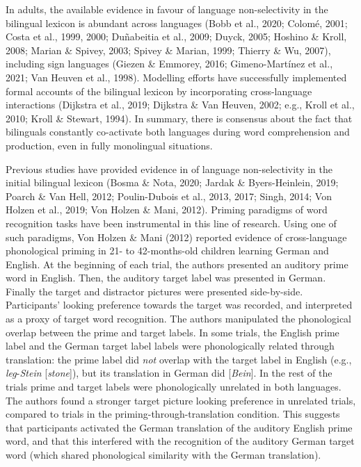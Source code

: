\documentclass[
  12pt,
  b5paperpaper,
  twoside]{scrreprt}
\begin{document}
In adults, the available evidence in favour of language non-selectivity
in the bilingual lexicon is abundant across languages (Bobb et al.,
2020; Colomé, 2001; Costa et al., 1999, 2000; Duñabeitia et al., 2009;
Duyck, 2005; Hoshino \& Kroll, 2008; Marian \& Spivey, 2003; Spivey \&
Marian, 1999; Thierry \& Wu, 2007), including sign languages (Giezen \&
Emmorey, 2016; Gimeno-Martínez et al., 2021; Van Heuven et al., 1998).
Modelling efforts have successfully implemented formal accounts of the
bilingual lexicon by incorporating cross-language interactions (Dijkstra
et al., 2019; Dijkstra \& Van Heuven, 2002; e.g., Kroll et al., 2010;
Kroll \& Stewart, 1994). In summary, there is consensus about the fact
that bilinguals constantly co-activate both languages during word
comprehension and production, even in fully monolingual situations.

Previous studies have provided evidence in of language non-selectivity
in the initial bilingual lexicon (Bosma \& Nota, 2020; Jardak \&
Byers-Heinlein, 2019; Poarch \& Van Hell, 2012; Poulin-Dubois et al.,
2013, 2017; Singh, 2014; Von Holzen et al., 2019; Von Holzen \& Mani,
2012). Priming paradigms of word recognition tasks have been
instrumental in this line of research. Using one of such paradigms, Von
Holzen \& Mani (2012) reported evidence of cross-language phonological
priming in 21- to 42-months-old children learning German and English. At
the beginning of each trial, the authors presented an auditory prime
word in English. Then, the auditory target label was presented in
German. Finally the target and distractor pictures were presented
side-by-side. Participants' looking preference towards the target was
recorded, and interpreted as a proxy of target word recognition. The
authors manipulated the phonological overlap between the prime and
target labels. In some trials, the English prime label and the German
target label labels were phonologically related through translation: the
prime label did \emph{not} overlap with the target label in English
(e.g., \emph{leg}-\emph{Stein} {[}\emph{stone}{]}), but its translation
in German did {[}\emph{Bein}{]}. In the rest of the trials prime and
target labels were phonologically unrelated in both languages. The
authors found a stronger target picture looking preference in unrelated
trials, compared to trials in the priming-through-translation condition.
This suggests that participants activated the German translation of the
auditory English prime word, and that this interfered with the
recognition of the auditory German target word (which shared
phonological similarity with the German translation).
\end{document}
